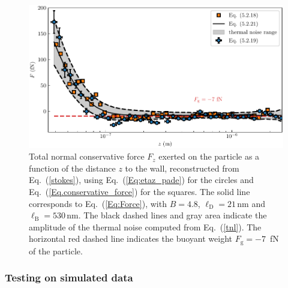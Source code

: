 \begin{figure}[H]
	\centering
	\includegraphics{02_body/chapter3/images/trajctory_analysis/figure_force_total.pdf}
	\caption{Total normal conservative force $F_z$ exerted on the particle as a function of the distance $z$ to the wall, reconstructed from Eq.~(\ref{stokes}), using Eq.~(\ref{Eq:etaz_pade}) for the circles and Eq.~(\ref{Eq.conservative_force}) for the squares. The solid line corresponds to Eq.~(\ref{Eq:Force}), with $B=4.8$, $\ell_{\mathrm{D}}=21\,\mathrm{nm}$ and $\ell_{\mathrm{B}}=530\,\mathrm{nm}$. The black dashed lines and gray area indicate the amplitude of the thermal noise computed from Eq.~(\ref{tnl}). The horizontal red dashed line indicates the buoyant weight $F_{\textrm{g}}=-7$~fN of the particle.~\href{https://github.com/eXpensia/Confined-Brownian-Motion/blob/main/02_body/chapter3/images/trajctory_analysis/measure_force_experimental.ipynb}{\faGithub}}
	\label{fig.figure_force_total}
\end{figure}

\subsubsection{Testing on simulated data}

